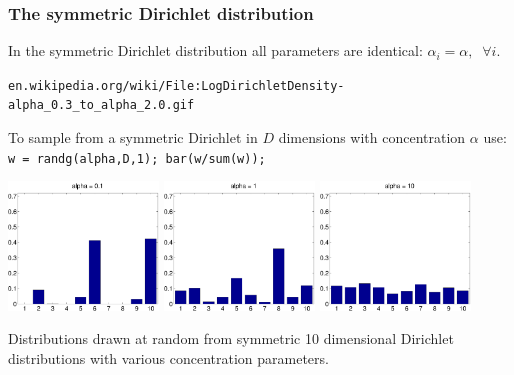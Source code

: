 \begin{frame}
\frametitle{The symmetric Dirichlet distribution}

In the symmetric Dirichlet distribution all parameters are identical:
$\alpha_i=\alpha,\;\; \forall i$.

{\small
\texttt{en.wikipedia.org/wiki/File:LogDirichletDensity-alpha\_0.3\_to\_alpha\_2.0.gif}
}

To sample from a symmetric Dirichlet in $D$ dimensions with
concentration $\alpha$ use: \texttt{w = randg(alpha,D,1); bar(w/sum(w));}\\[4mm]

\centerline{
\includegraphics[width=0.3\textwidth]{dira}
\includegraphics[width=0.3\textwidth]{dirb}
\includegraphics[width=0.3\textwidth]{dirc}
}

Distributions drawn at random from symmetric 10 dimensional Dirichlet distributions
with various concentration parameters.
\end{frame}


